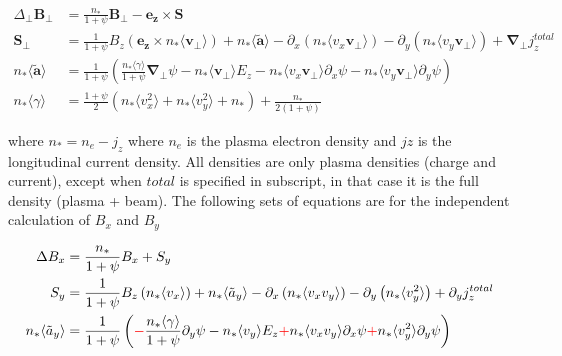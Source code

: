 \documentclass{article}
\begin{document}
\begin{subequations}
\begin{align}
\Delta_\perp \bm{B_\perp} &= \frac{n_*}{1+\psi} \bm{B_\perp} - \bm{e_z} \times \bm{S} \\
\bm{S}_\perp &= \frac{1}{1+\psi} B_z \left( \bm{e_z} \times n_* \langle\bm{v_\perp}\rangle \right) + n_* \langle \bm{\tilde{a}} \rangle - \partial_x\left( n_*\langle v_x\bm{v_\perp} \rangle \right) - \partial_y\left( n_*\langle v_y\bm{v_\perp} \rangle \right) + \bm{\nabla_\perp}j_z^{total} \\
n_* \langle \bm{\tilde{a}} \rangle &= \frac{1}{1+\psi} \left(  \frac{n_*\langle\gamma\rangle}{1+\psi}\bm{\nabla_\perp}\psi - n_* \langle \bm{v_\perp} \rangle E_z - n_* \langle v_x\bm{v_\perp}\rangle \partial_x\psi - n_* \langle v_y\bm{v_\perp}\rangle \partial_y\psi \right) \\
n_*\langle \gamma\rangle &= \frac{1+\psi}{2}\left(n_*\langle v_x^2\rangle + n_*\langle v_y^2\rangle + n_*\right) + \frac{n_*}{2(1+\psi)}
\end{align}
\end{subequations}

where $n_* = n_e - j_z$ where $n_e$ is the plasma electron density and $jz$ is the longitudinal current density. All densities are only plasma densities (charge and current), except when $total$ is specified in subscript, in that case it is the full density (plasma + beam). The following sets of equations are for the independent calculation of $B_x$ and $B_y$

\begin{subequations}
    \begin{align}
    \Delta B_x &= \frac{n_*}{1+\psi} B_x + S_y \\
    S_y &= \frac{1}{1+\psi} B_z \left(n_* \langle v_x\rangle \right) + n_* \langle \tilde{a}_y \rangle - \partial_x\left( n_*\langle v_x v_y \rangle \right) - \partial_y\left( n_*\langle v_y^2 \rangle \right) + \partial_y j_z^{total} \\
    n_* \langle \tilde{a}_y \rangle &= \frac{1}{1+\psi} \left( \textcolor{red}{-} \frac{n_*\langle\gamma\rangle}{1+\psi}\partial_y\psi - n_* \langle v_y \rangle E_z \textcolor{red}{+} n_* \langle v_x v_y\rangle \partial_x\psi \textcolor{red}{+} n_* \langle v_y^2 \rangle \partial_y\psi \right) \\
    \end{align}
\end{subequations}
\end{document}
